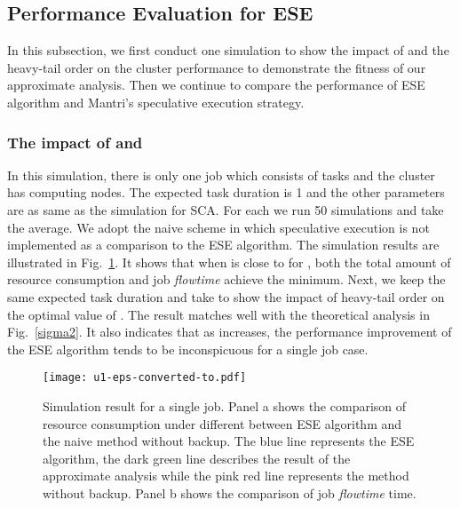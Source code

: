 \documentclass[10pt,conference]{IEEEtran}
\begin{document}
\subsection{Performance Evaluation for ESE}
In this subsection, we first conduct one  simulation to  show the impact of  and the heavy-tail order on the cluster performance  to demonstrate the fitness of our approximate analysis. Then  we continue to compare the performance of ESE algorithm and Mantri's speculative execution strategy.

\vspace{0.2em}
\subsubsection{The impact of  and }
In this simulation, there is only one job which consists of  tasks and the cluster has  computing nodes. The expected task duration is 1 and the other parameters are as same as the simulation for SCA. For each  we run 50 simulations and take the average. We adopt the naive scheme in which speculative execution is not implemented as a comparison to the ESE algorithm. The simulation results are illustrated in Fig.~\ref{single}. It shows that when  is close to  for , both the total amount of resource consumption and job \textit{flowtime} achieve the minimum. Next, we keep the same expected task duration and take  to show the impact of heavy-tail order on the optimal value of .  The result matches well with the theoretical analysis in Fig.~\ref{sigma2}. It also indicates that as  increases, the performance improvement of the ESE algorithm tends to be inconspicuous for a single job case.
\begin{figure}
\centering
\texttt{[image: u1-eps-converted-to.pdf]}
\caption{Simulation result for a single job. Panel a shows the comparison of resource consumption under different  between ESE algorithm and the naive method without backup. The blue line represents the ESE algorithm, the dark green line describes the result of the approximate analysis while the pink red line represents the method without backup. Panel b shows the comparison of job \textit{flowtime} time. }
\label{single}
\vspace{-0.3 cm}
\end{figure}
\end{document}
